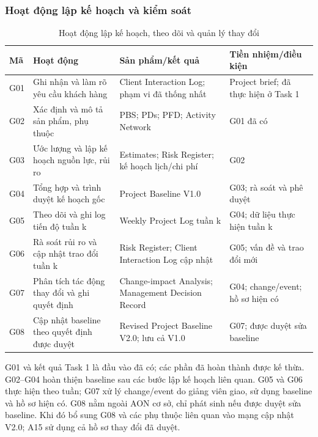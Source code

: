 \subsubsection{Hoạt động lập kế hoạch và kiểm soát}
\begin{table}[H]
\centering
\caption{Hoạt động lập kế hoạch, theo dõi và quản lý thay đổi}
\footnotesize
\renewcommand{\arraystretch}{1.25}
\begin{tabularx}{\linewidth}{|p{0.8cm}|p{2.6cm}|>{\raggedright\arraybackslash}X|p{2.2cm}|}
\hline
\textbf{Mã} & \textbf{Hoạt động} & \textbf{Sản phẩm/kết quả} & \textbf{Tiền nhiệm/điều kiện} \\ \hline
G01 & Ghi nhận và làm rõ yêu cầu khách hàng & Client Interaction Log; phạm vi đã thống nhất & Project brief; đã thực hiện ở Task 1 \\ \hline
G02 & Xác định và mô tả sản phẩm, phụ thuộc & PBS; PDs; PFD; Activity Network & G01 đã có \\ \hline
G03 & Ước lượng và lập kế hoạch nguồn lực, rủi ro & Estimates; Risk Register; kế hoạch lịch/chi phí & G02 \\ \hline
G04 & Tổng hợp và trình duyệt kế hoạch gốc & Project Baseline V1.0 & G03; rà soát và phê duyệt \\ \hline
G05 & Theo dõi và ghi log tiến độ tuần k & Weekly Project Log tuần k & G04; dữ liệu thực hiện tuần k \\ \hline
G06 & Rà soát rủi ro và cập nhật trao đổi tuần k & Risk Register; Client Interaction Log cập nhật & G05; vấn đề và trao đổi mới \\ \hline
G07 & Phân tích tác động thay đổi và ghi quyết định & Change-impact Analysis; Management Decision Record & G04; change/event; hồ sơ hiện có \\ \hline
G08 & Cập nhật baseline theo quyết định được duyệt & Revised Project Baseline V2.0; lưu cả V1.0 & G07; được duyệt sửa baseline \\ \hline
\end{tabularx}
\end{table}

G01 và kết quả Task 1 là đầu vào đã có; các phần đã hoàn thành được kế thừa. G02--G04 hoàn thiện baseline sau các bước lập kế hoạch liên quan. G05 và G06 thực hiện theo tuần; G07 xử lý change/event do giảng viên giao, sử dụng baseline và hồ sơ hiện có. G08 nằm ngoài AON cơ sở, chỉ phát sinh nếu được duyệt sửa baseline. Khi đó bổ sung G08 và các phụ thuộc liên quan vào mạng cập nhật V2.0; A15 sử dụng cả hồ sơ thay đổi đã duyệt.

